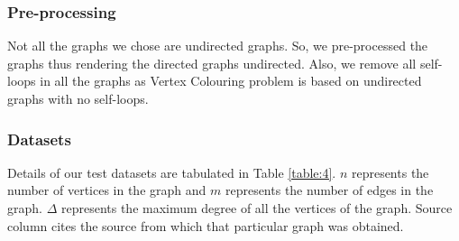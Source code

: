 \documentclass[MTech]{iitmdiss}
\begin{document}
\subsubsection{Pre-processing}
Not all the graphs we chose are undirected graphs. So, we pre-processed the graphs thus rendering the directed graphs undirected. Also, we remove all self-loops in all the graphs as Vertex Colouring problem is based on undirected graphs with no self-loops. 

\subsubsection{Datasets}
Details of our test datasets are tabulated in Table \ref{table:4}. $n$ represents the number of vertices in the graph and $m$ represents the number of edges in the graph. $\Delta$ represents the maximum degree of all the vertices of the graph. Source column cites the source from which that particular graph was obtained.
\end{document}
